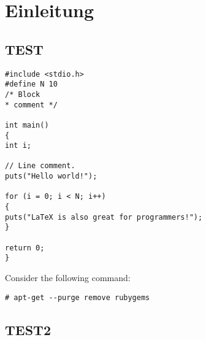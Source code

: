 \chapter{Einleitung}
\label{chap:einleitung}

\section{TEST}

\begin{lstlisting}[style=customc]
#include <stdio.h>
#define N 10
/* Block
* comment */

int main()
{
int i;

// Line comment.
puts("Hello world!");

for (i = 0; i < N; i++)
{
puts("LaTeX is also great for programmers!");
}

return 0;
}
\end{lstlisting}

\bigskip
\noindent Consider the following command:
\begin{lstlisting}[style=BashInputStyle]
# apt-get --purge remove rubygems
\end{lstlisting}



\section{TEST2}


